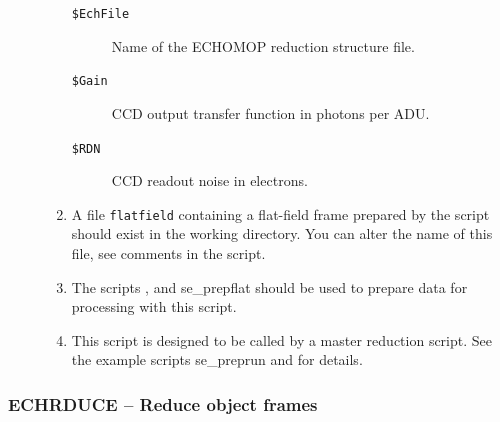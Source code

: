 \documentclass[twoside,11pt]{starlink}
\providecommand{\scspec}[2]{#1}
\begin{document}
\begin{description}
\begin{enumerate}
\begin{description}
\item [{\tt{\$EchFile}}]
      Name of the ECHOMOP reduction structure file.

\item [{\tt{\$Gain}}]
      CCD output transfer function in photons per ADU.

\item [{\tt{\$RDN}}]
      CCD readout noise in electrons.

\end{description}

\item A file \verb+flatfield+ containing a flat-field frame prepared by the
      script  should exist in the
      working directory.
      You can alter the name of this file, see comments in the
      script.

\item The scripts ,
       and 
      {se_prepflat} should be used to prepare data for processing with this
      script.

\item This script is designed to be called by a master reduction
      script.  See the example scripts 
      {se_preprun}
      and  for details.

\end{enumerate}
\end{description}

\newpage
\subsubsection{\label{se_echrduce}ECHRDUCE
                \scspec{--}{-} Reduce object frames}
\end{document}
